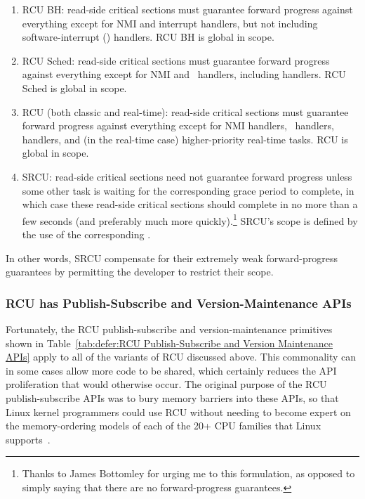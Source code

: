 \begin{enumerate}
\item	RCU BH: read-side critical sections
	must guarantee forward progress against everything except for
	NMI and interrupt handlers, but not including software-interrupt
	() handlers.
	RCU BH is global in scope.
\item	RCU Sched: read-side critical sections must guarantee forward
	progress against everything except for NMI and \IRQ\ handlers,
	including  handlers.
	RCU Sched is global in scope.
\item	RCU (both classic and real-time): read-side critical sections
	must guarantee forward progress against everything except for
	NMI handlers, \IRQ\ handlers,  handlers, and (in the
	real-time case) higher-priority real-time tasks.
	RCU is global in scope.
\item	SRCU: read-side critical sections need not guarantee
	forward progress unless some other task is waiting for the
	corresponding grace period to complete, in which case these
	read-side critical sections should complete in no more than
	a few seconds (and preferably much more quickly).\footnote{
		Thanks to James Bottomley for urging me to this
		formulation, as opposed to simply saying that
		there are no forward-progress guarantees.}
	SRCU's scope is defined by the use of the corresponding
	.
\end{enumerate}

In other words, SRCU compensate for their extremely weak
forward-progress guarantees by permitting the developer to restrict
their scope.

\subsubsection{RCU has Publish-Subscribe and Version-Maintenance APIs}
\label{sec:defer:RCU has Publish-Subscribe and Version-Maintenance APIs}

Fortunately, the RCU publish-subscribe and version-maintenance
primitives shown in
Table~\ref{tab:defer:RCU Publish-Subscribe and Version Maintenance APIs}
apply to all of the variants of RCU discussed above.
This commonality can in some cases allow more code to be shared,
which certainly reduces the API proliferation that would otherwise
occur.
The original purpose of the RCU publish-subscribe APIs was to
bury memory barriers into these APIs, so that Linux kernel
programmers could use RCU without needing to become expert on
the memory-ordering models of each of the 20+ CPU families
that Linux supports~\cite{Spraul01}.


